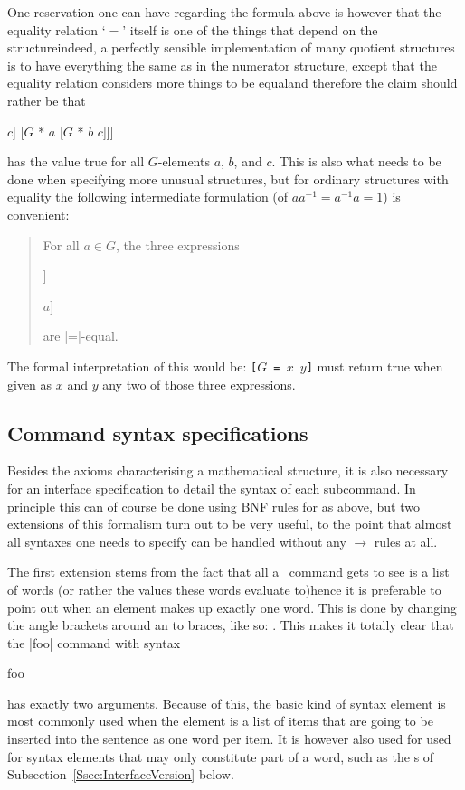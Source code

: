 \documentclass{mtmtcl}
\theoremstyle{plain}
\theoremstyle{remark}
\begin{document}
One reservation one can have regarding the formula above is however 
that the equality relation `$=$' itself is one of the things that 
depend on the structure\Ldash indeed, a perfectly sensible 
implementation of many quotient structures is to have everything the 
same as in the numerator structure, except that the equality relation 
considers more things to be equal\Rdash and therefore the claim 
should rather be that
\begin{displaysyntax}
  [$G$ = [$G$ * [$G$ * $a$ $b$] $c$] [$G$ * $a$ [$G$ * $b$ $c$]]]
\end{displaysyntax}
has the value true for all $G$-elements $a$, $b$, and $c$. This is 
also what needs to be done when specifying more unusual structures, 
but for ordinary structures with equality the following intermediate 
formulation (of \(aa^{-1} = a^{-1}a = 1\)) is convenient:
\begin{quote}
  For all \(a \in G\), the three expressions
  \begin{displaysyntax}
    [$G$ * $a$ [$G$ inv $a$]]\par
    [$G$ * [$G$ inv $a$] $a$]\par
    [$G$ 1]
  \end{displaysyntax}
  are |=|-equal.
\end{quote}
The formal interpretation of this would be: \texttt{[$G$ = $x$ $y$]} 
must return true when given as $x$ and $y$ any two of those three 
expressions.


\subsection{Command syntax specifications}

Besides the axioms characterising a mathematical structure, it is 
also necessary for an interface specification to detail the syntax 
of each subcommand. In principle this can of course be done using BNF 
rules for  as above, but two extensions of this 
formalism turn out to be very useful, to the point that almost all 
syntaxes one needs to specify can be handled without any 
$\longrightarrow$ rules at all.

The first extension stems from the fact that all a \Tcl\ command gets 
to see is a list of words (or rather the values these words evaluate 
to)\Dash hence it is preferable to point out when an element makes up 
exactly one word. This is done by changing the angle brackets around 
an  to braces, like so: . This makes it 
totally clear that the |foo| command with syntax
\begin{displaysyntax}
  foo  
\end{displaysyntax}
has exactly two arguments.
Because of this, the basic  kind of syntax element is most 
commonly used when the element is a list of items that are going to 
be inserted into the sentence as one word per item. It is however 
also used for used for syntax elements that may only constitute part 
of a word, such as the s of 
Subsection~\ref{Ssec:InterfaceVersion} below.
\end{document}
